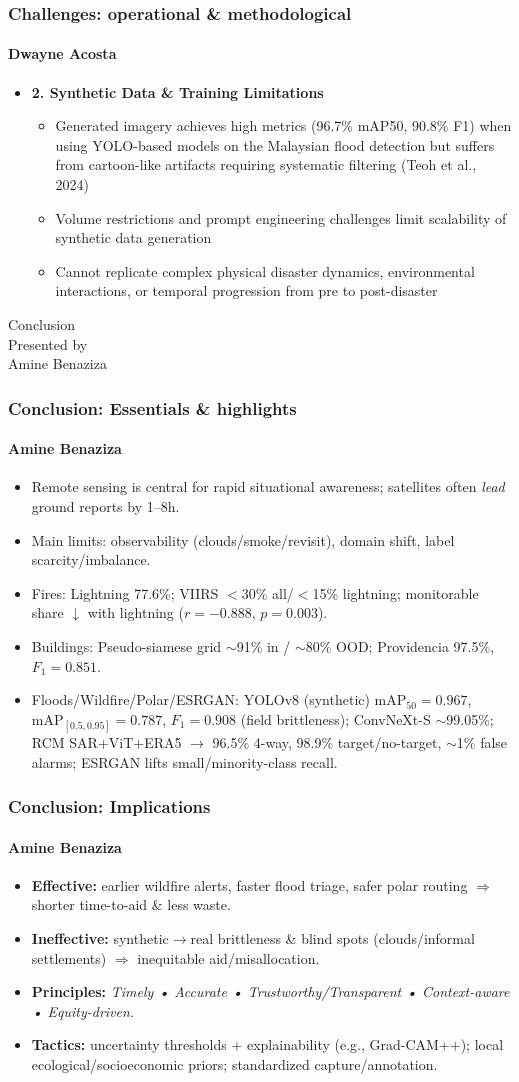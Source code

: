 \documentclass{beamer}
\newcommand{\namedframe}[3]{
  \begin{frame}
    \frametitle{#2}
    \framesubtitle{#1}
    #3
  \end{frame}
}
\newcommand{\sectionframe}[2]{
  \begin{frame}
    \begin{center}
      \usebeamerfont{title}\usebeamercolor[fg]{title}\Huge #2\\
      \vspace{2em}
      \normalsize Presented by \\
      \vspace{0.5em}
      \usebeamerfont{frametitle}\usebeamercolor[fg]{frametitle}\LARGE
      #1
    \end{center}
  \end{frame}
}
\begin{document}
\namedframe{Dwayne Acosta}{Challenges: operational \& methodological}{
\begin{itemize}

    \item \textbf{2. Synthetic Data \& Training Limitations}
    \begin{itemize}
        \item Generated imagery achieves high metrics (96.7\% mAP50, 90.8\% F1) when using YOLO-based models on the Malaysian flood detection but suffers from cartoon-like artifacts requiring systematic filtering (Teoh et al., 2024)
        \item Volume restrictions and prompt engineering challenges limit scalability of synthetic data generation
        \item Cannot replicate complex physical disaster dynamics, environmental interactions, or temporal progression from pre to post-disaster
    \end{itemize}
\end{itemize}
}

\sectionframe{Amine Benaziza}{Conclusion}

\namedframe{Amine Benaziza}{Conclusion: Essentials \& highlights}{
\footnotesize
\begin{itemize}
  \item Remote sensing is central for rapid situational awareness; satellites often \emph{lead} ground reports by 1–8h.
  \item Main limits: observability (clouds/smoke/revisit), domain shift, label scarcity/imbalance.
  \item Fires: Lightning 77.6\%; VIIRS $<$30\% all/$<$15\% lightning; monitorable share $\downarrow$ with lightning ($r=-0.888$, $p=0.003$).
  \item Buildings: Pseudo-siamese grid $\sim$91\% in / $\sim$80\% OOD; Providencia 97.5\%, $F_1=0.851$.
  \item Floods/Wildfire/Polar/ESRGAN: YOLOv8 (synthetic) $\mathrm{mAP}_{50}=0.967$, $\mathrm{mAP}_{[0.5,0.95]}=0.787$, $F_1=0.908$ (field brittleness); ConvNeXt-S $\sim$99.05\%; RCM SAR+ViT+ERA5 $\rightarrow$ 96.5\% 4-way, 98.9\% target/no-target, $\sim$1\% false alarms; ESRGAN lifts small/minority-class recall.
\end{itemize}
}

\namedframe{Amine Benaziza}{Conclusion: Implications}{
\footnotesize
\begin{itemize}
  \item \textbf{Effective:} earlier wildfire alerts, faster flood triage, safer polar routing $\Rightarrow$ shorter time-to-aid \& less waste.
  \item \textbf{Ineffective:} synthetic$\to$real brittleness \& blind spots (clouds/informal settlements) $\Rightarrow$ inequitable aid/misallocation.
  \item \textbf{Principles:} \emph{Timely • Accurate • Trustworthy/Transparent • Context-aware • Equity-driven}.
  \item \textbf{Tactics:} uncertainty thresholds + explainability (e.g., Grad-CAM++); local ecological/socioeconomic priors; standardized capture/annotation.
\end{itemize}
}
\end{document}
